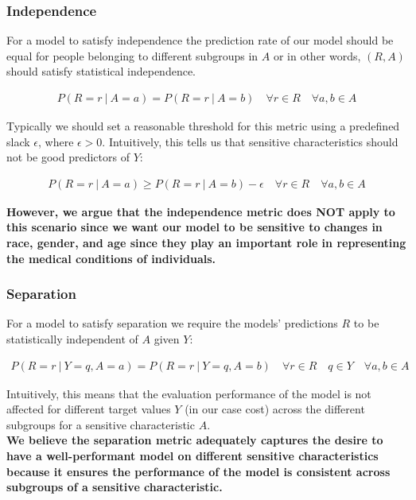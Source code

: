 \documentclass[11pt]{article}
\begin{document}
\subsubsection{Independence}

For a model to satisfy independence the prediction rate of our model should be equal for people belonging to different subgroups in $A$ or in other words, $(R, A)$ should satisfy statistical independence.

\begin{align*}
    P(R=r\ |\ A=a)=P(R=r\ |\ A=b)\quad \forall r\in R\quad \forall a,b \in A
\end{align*}

Typically we should set a reasonable threshold for this metric using a predefined slack $\epsilon$, where $\epsilon > 0$. Intuitively, this tells us that sensitive characteristics should not be good predictors of $Y$:

\begin{align*}
    P(R=r\ |\ A=a)\geq P(R=r\ |\ A=b)-\epsilon \quad \forall r\in R\quad \forall a,b\in A
\end{align*}

\textbf{However, we argue that the independence metric does NOT apply to this scenario since we want our model to be sensitive to changes in race, gender, and age since they play an important role in representing the medical conditions of individuals.}

\subsubsection{Separation}

For a model to satisfy separation we require the models' predictions $R$ to be statistically independent of $A$ given $Y$:

\begin{align*}
    P(R=r\ |\ Y=q,A=a)=P(R=r\ |\ Y=q,A=b)\quad \forall r\in R\quad q\in Y\quad \forall a,b\in A
\end{align*}

Intuitively, this means that the evaluation performance of the model is not affected for different target values $Y$ (in our case cost) across the different subgroups for a sensitive characteristic $A$.\\

\textbf{We believe the separation metric adequately captures the desire to have a well-performant model on different sensitive characteristics because it ensures the performance of the model is consistent across subgroups of a sensitive characteristic.}
\end{document}
